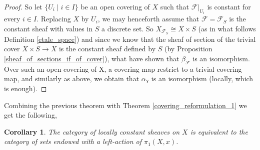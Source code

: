 \documentclass{article}
\theoremstyle{plain}
\newtheorem{corollary}[theorem]{Corollary}
\theoremstyle{definition}
\begin{document}
\begin{proof}
    So let $\{U_i\mid i\in I\}$ be an open covering of $X$ such that $\mathcal{F}\vert_{U_i}$ is constant for every $i\in I$.
    Replacing $X$ by $U_i$, we may henceforth assume that $\mathcal{F} = \mathcal{F}_S$ is the constant sheaf with values in $S$ a discrete set.
    So $X_{\mathcal{F}_S} \cong X\times S$ (as in what follows Definition \ref{etale_space}) and since we know that the sheaf of section of the trivial cover $X\times S\rightarrow X$ is the constant sheaf defined by $S$ (by Proposition \ref{sheaf_of_sections_if_of_cover}), what have shown that $\beta_{\mathcal{F}}$ is an isomorphism.
    Over such an open covering of X, a covering map restrict to a trivial covering map, and similarly as above, we obtain that $\alpha_Y$ is an isomorphism (locally, which is enough).
\end{proof}

\noindent Combining the previous theorem with Theorem \ref{covering_reformulation_1} we get the following,

\begin{corollary}
    The category of locally constant sheaves on $X$ is equivalent to the category of sets endowed with a left-action of $\pi_1(X,x)$.
\end{corollary}
\end{document}
